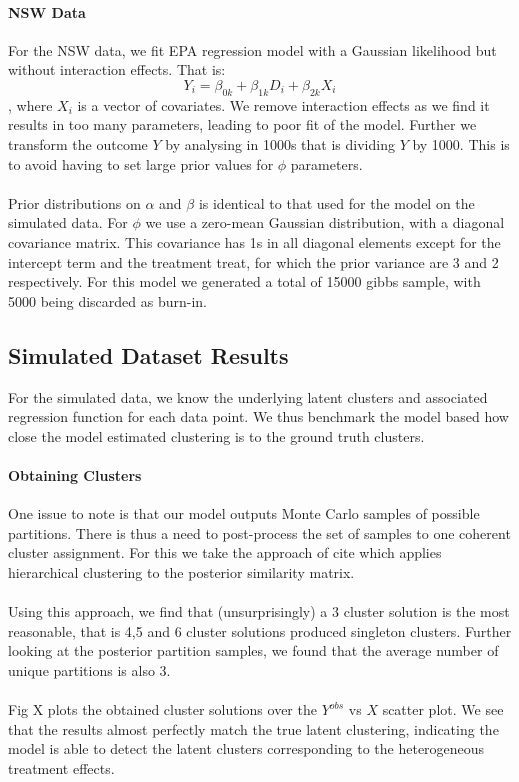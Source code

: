 \documentclass{article}
\begin{document}
\paragraph{NSW Data} For the NSW data, we fit EPA regression model with a Gaussian likelihood but without interaction effects. That is:
$$Y_i = \beta_{0k} + \beta_{1k}D_i + \beta_{2k}X_i$$, where $X_i$ is a vector of covariates. We remove interaction effects as we find it results in too many parameters, leading to poor fit of the model. Further we transform the outcome $Y$ by analysing in 1000s that is dividing $Y$ by 1000. This is to avoid having to set large prior values for $\phi$ parameters.
\\ \\
Prior distributions on $\alpha$ and $\beta$ is identical to that used for the model on the simulated data. For $\phi$ we use a zero-mean Gaussian distribution, with a diagonal covariance matrix. This covariance has 1s in all diagonal elements except for the intercept term and the treatment treat, for which the prior variance are 3 and 2 respectively. For this model we generated a total of 15000 gibbs sample, with 5000 being discarded as burn-in. 

\subsection{Simulated Dataset Results} 
For the simulated data, we know the underlying latent clusters and associated regression function for each data point. We thus benchmark the model based how close the model estimated clustering is to the ground truth clusters. 

\paragraph{Obtaining Clusters} One issue to note is that our model outputs Monte Carlo samples of possible partitions. There is thus a need to post-process the set of samples to one coherent cluster assignment. For this we take the approach of cite which applies hierarchical clustering to the posterior similarity matrix. 
\\ \\
Using this approach, we find that (unsurprisingly) a 3 cluster solution is the most reasonable, that is 4,5 and 6 cluster solutions produced singleton clusters. Further looking at the posterior partition samples, we found that the average number of unique partitions is also 3. 
\\ \\
Fig X plots the obtained cluster solutions over the $Y^{obs}$ vs $X$ scatter plot. We see that the results almost perfectly match the true latent clustering, indicating the model is able to detect the latent clusters corresponding to the heterogeneous treatment effects. 
\\ \\
\end{document}
